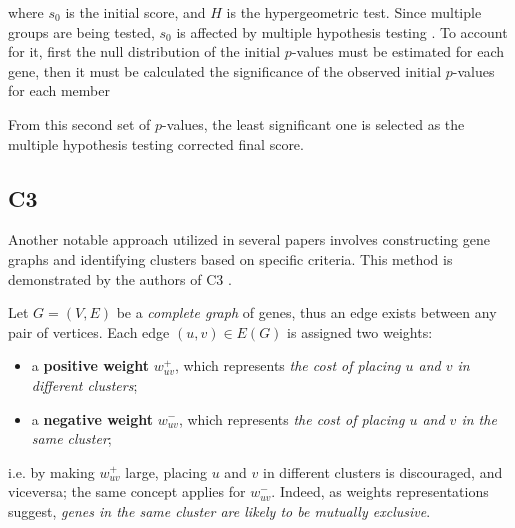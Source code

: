 where $s_0$ is the initial score, and $H$ is the hypergeometric test. Since multiple groups are being tested, $s_0$ is affected by multiple hypothesis testing . To account for it, first the null distribution of the initial $p$-values must be estimated for each gene, then it must be calculated the significance of the observed initial $p$-values for each member 

From this second set of $p$-values, the least significant one is selected as the multiple hypothesis testing corrected final score. 

\subsection{C3}

Another notable approach utilized in several papers involves constructing gene graphs and identifying clusters based on specific criteria. This method is demonstrated by the authors of C3 \cite{c3}.

Let $G = (V, E)$ be a \textit{complete graph} of genes, thus an edge exists between any pair of vertices. Each edge $(u, v) \in E(G)$ is assigned two weights:

\begin{itemize}
    \item a \textbf{positive weight} $w_{uv}^+$, which represents \textit{the cost of placing $u$ and $v$ in different clusters};
    \item a \textbf{negative weight} $w_{uv}^-$, which represents \textit{the cost of placing $u$ and $v$ in the same cluster};
\end{itemize}

i.e. by making $w_{uv}^+$ large, placing $u$ and $v$ in different clusters is discouraged, and viceversa; the same concept applies for $w_{uv}^-$. Indeed, as weights representations suggest, \textit{genes in the same cluster are likely to be mutually exclusive}.

